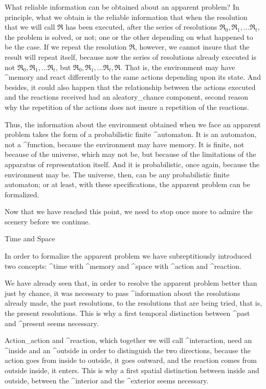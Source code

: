 What reliable information can be obtained about an apparent problem? In
principle, what we obtain is the reliable information that when the
resolution that we will call $\Re$ has been executed, after the series
of resolutions  $\Re_0, \Re_1, \ldots \Re_t$, the problem is solved, or
not; one or the other depending on what happened to be the case. If we
repeat the resolution $\Re$, however, we cannot insure that the result
will repeat itself, because now the series of resolutions already
executed is not
 $\Re_0, \Re_1, \ldots \Re_t$, but $\Re_0, \Re_1, \ldots \Re_t, \Re$.
That is, the environment may have ^{memory} and react differently to the
same actions depending upon its state. And besides, it could also happen
that the relationship between the actions executed and the reactions
received had an aleatory_{chance} component, second reason why the
repetition of the actions does not insure a repetition of the reactions.

Thus, the information about the environment obtained when we face an
apparent problem takes the form of a probabilistic finite ^{automaton}.
It is an automaton, not a ^{function}, because the environment may have
memory. It is finite, not because of the universe, which may not be, but
because of the limitations of the apparatus of representation itself.
And it is probabilistic, once again, because the environment may be. The
universe, then, can be any probabilistic finite automaton; or at least,
with these specifications, the apparent problem can be formalized.

Now that we have reached this point, we need to stop once more to admire
the scenery before we continue.


\Section Time and Space

In order to formalize the apparent problem we have subreptitiously
introduced two concepts: ^{time} with ^{memory} and ^{space} with
^{action} and ^{reaction}.

We have already seen that, in order to resolve the apparent problem
better than just by chance, it was necessary to pass ^{information}
about the resolutions already made, the past resolutions, to the
resolutions that are being tried, that is, the present resolutions. This
is why a first temporal distinction between ^{past} and ^{present} seems
necessary.

Action_{action} and ^{reaction}, which together we will call
^{interaction}, need an ^{inside} and an ^{outside} in order to
distinguish the two directions, because the action goes from inside to
outside, it goes outward, and the reaction comes from outside inside, it
enters. This is why a first spatial distinction between inside and
outside, between the ^{interior} and the ^{exterior} seems necessary.

